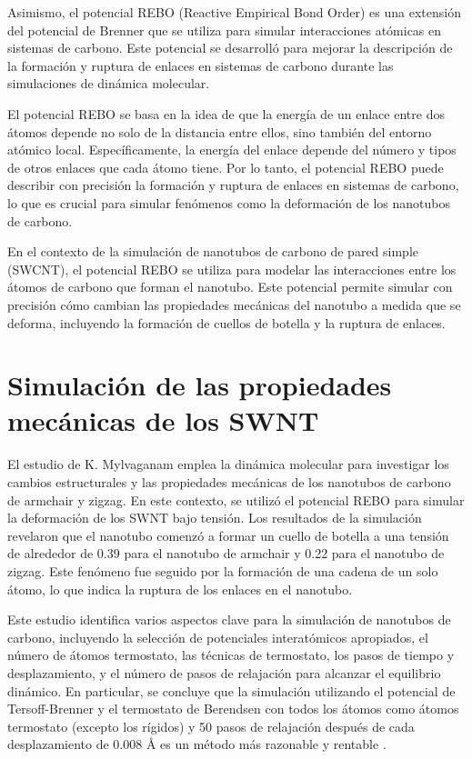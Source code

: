 \documentclass[a4paper]{article}
\begin{document}
Asimismo, el potencial REBO (Reactive Empirical Bond Order) es una extensión del potencial de Brenner que se utiliza para simular interacciones atómicas en sistemas de carbono. Este potencial se desarrolló para mejorar la descripción de la formación y ruptura de enlaces en sistemas de carbono durante las simulaciones de dinámica molecular.

El potencial REBO se basa en la idea de que la energía de un enlace entre dos átomos depende no solo de la distancia entre ellos, sino también del entorno atómico local. Específicamente, la energía del enlace depende del número y tipos de otros enlaces que cada átomo tiene. Por lo tanto, el potencial REBO puede describir con precisión la formación y ruptura de enlaces en sistemas de carbono, lo que es crucial para simular fenómenos como la deformación de los nanotubos de carbono.

En el contexto de la simulación de nanotubos de carbono de pared simple (SWCNT), el potencial REBO se utiliza para modelar las interacciones entre los átomos de carbono que forman el nanotubo. Este potencial permite simular con precisión cómo cambian las propiedades mecánicas del nanotubo a medida que se deforma, incluyendo la formación de cuellos de botella y la ruptura de enlaces.

\section{Simulación de las propiedades mecánicas de los SWNT}

El estudio de K. Mylvaganam \cite{mylvaganam2004important} emplea la dinámica molecular para investigar los cambios estructurales y las propiedades mecánicas de los nanotubos de carbono de armchair y zigzag. En este contexto, se utilizó el potencial REBO para simular la deformación de los SWNT bajo tensión. Los resultados de la simulación revelaron que el nanotubo comenzó a formar un cuello de botella a una tensión de alrededor de 0.39 para el nanotubo de armchair y 0.22 para el nanotubo de zigzag. Este fenómeno fue seguido por la formación de una cadena de un solo átomo, lo que indica la ruptura de los enlaces en el nanotubo. 

Este estudio identifica varios aspectos clave para la simulación de nanotubos de carbono, incluyendo la selección de potenciales interatómicos apropiados, el número de átomos termostato, las técnicas de termostato, los pasos de tiempo y desplazamiento, y el número de pasos de relajación para alcanzar el equilibrio dinámico. En particular, se concluye que la simulación utilizando el potencial de Tersoff-Brenner y el termostato de Berendsen con todos los átomos como átomos termostato (excepto los rígidos) y 50 pasos de relajación después de cada desplazamiento de 0.008 Å es un método más razonable y rentable \cite{mylvaganam2004important}. 
\end{document}
